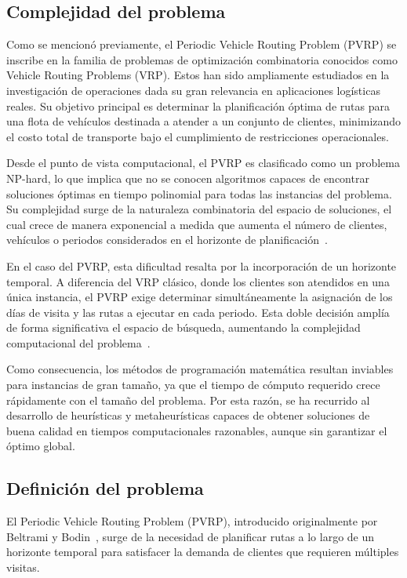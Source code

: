 \subsection{Complejidad del problema} \label{sec:Complejidaddelproblema}
Como se mencionó previamente, el Periodic Vehicle Routing Problem (PVRP) se inscribe en la familia de problemas de optimización combinatoria conocidos como Vehicle Routing Problems (VRP). Estos han sido ampliamente estudiados en la investigación de operaciones dada su gran relevancia en aplicaciones logísticas reales. Su objetivo principal es determinar la planificación óptima de rutas para una flota de vehículos destinada a atender a un conjunto de clientes, minimizando el costo total de transporte bajo el cumplimiento de restricciones operacionales.

Desde el punto de vista computacional, el PVRP es clasificado como un problema NP-hard, lo que implica que no se conocen algoritmos capaces de encontrar soluciones óptimas en tiempo polinomial para todas las instancias del problema. Su complejidad surge de la naturaleza combinatoria del espacio de soluciones, el cual crece de manera exponencial a medida que aumenta el número de clientes, vehículos o periodos considerados en el horizonte de planificación~\cite{inbook}.

En el caso del PVRP, esta dificultad resalta por la incorporación de un horizonte temporal. A diferencia del VRP clásico, donde los clientes son atendidos en una única instancia, el PVRP exige determinar simultáneamente la asignación de los días de visita y las rutas a ejecutar en cada periodo. Esta doble decisión amplía de forma significativa el espacio de búsqueda, aumentando la complejidad computacional del problema~\cite{EKSIOGLU20091472}.

Como consecuencia, los métodos de programación matemática resultan inviables para instancias de gran tamaño, ya que el tiempo de cómputo requerido crece rápidamente con el tamaño del problema. Por esta razón, se ha recurrido al desarrollo de heurísticas y metaheurísticas capaces de obtener soluciones de buena calidad en tiempos computacionales razonables, aunque sin garantizar el óptimo global.

\subsection{Definición del problema} \label{sec:Definiciondelproblema}
El Periodic Vehicle Routing Problem (PVRP), introducido originalmente por Beltrami y Bodin~\cite{BeltramiBodin}, surge de la necesidad de planificar rutas a lo largo de un horizonte temporal para satisfacer la demanda de clientes que requieren múltiples visitas. 

